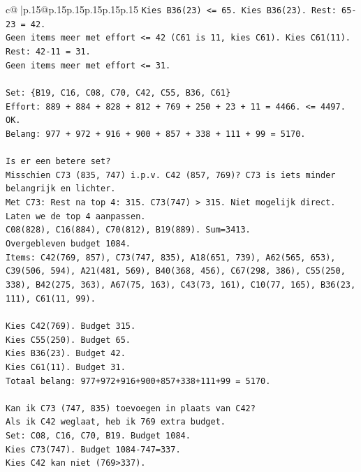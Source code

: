 \documentclass{article}
\begin{document}
{\begin{supertabular}{c@{$\;$}|p{.15\linewidth}@{}p{.15\linewidth}p{.15\linewidth}p{.15\linewidth}p{.15\linewidth}p{.15\linewidth}}
{{{\texttt{Kies B36(23) <= 65. Kies B36(23). Rest: 65{-}23 = 42.} \\
\texttt{Geen items meer met effort <= 42 (C61 is 11, kies C61). Kies C61(11). Rest: 42{-}11 = 31.} \\
\texttt{Geen items meer met effort <= 31.} \\
\\ 
\texttt{Set: \{B19, C16, C08, C70, C42, C55, B36, C61\}} \\
\texttt{Effort: 889 + 884 + 828 + 812 + 769 + 250 + 23 + 11 = 4466. <= 4497. OK.} \\
\texttt{Belang: 977 + 972 + 916 + 900 + 857 + 338 + 111 + 99 = 5170.} \\
\\ 
\texttt{Is er een betere set?} \\
\texttt{Misschien C73 (835, 747) i.p.v. C42 (857, 769)? C73 is iets minder belangrijk en lichter.} \\
\texttt{Met C73: Rest na top 4: 315. C73(747) > 315. Niet mogelijk direct.} \\
\texttt{Laten we de top 4 aanpassen.} \\
\texttt{C08(828), C16(884), C70(812), B19(889). Sum=3413.} \\
\texttt{Overgebleven budget 1084.} \\
\texttt{Items: C42(769, 857), C73(747, 835), A18(651, 739), A62(565, 653), C39(506, 594), A21(481, 569), B40(368, 456), C67(298, 386), C55(250, 338), B42(275, 363), A67(75, 163), C43(73, 161), C10(77, 165), B36(23, 111), C61(11, 99).} \\
\\ 
\texttt{Kies C42(769). Budget 315.} \\
\texttt{Kies C55(250). Budget 65.} \\
\texttt{Kies B36(23). Budget 42.} \\
\texttt{Kies C61(11). Budget 31.} \\
\texttt{Totaal belang: 977+972+916+900+857+338+111+99 = 5170.} \\
\\ 
\texttt{Kan ik C73 (747, 835) toevoegen in plaats van C42?} \\
\texttt{Als ik C42 weglaat, heb ik 769 extra budget.} \\
\texttt{Set: C08, C16, C70, B19. Budget 1084.} \\
\texttt{Kies C73(747). Budget 1084{-}747=337.} \\
\texttt{Kies C42 kan niet (769>337).} \\
}}}
\end{supertabular}}
\end{document}
